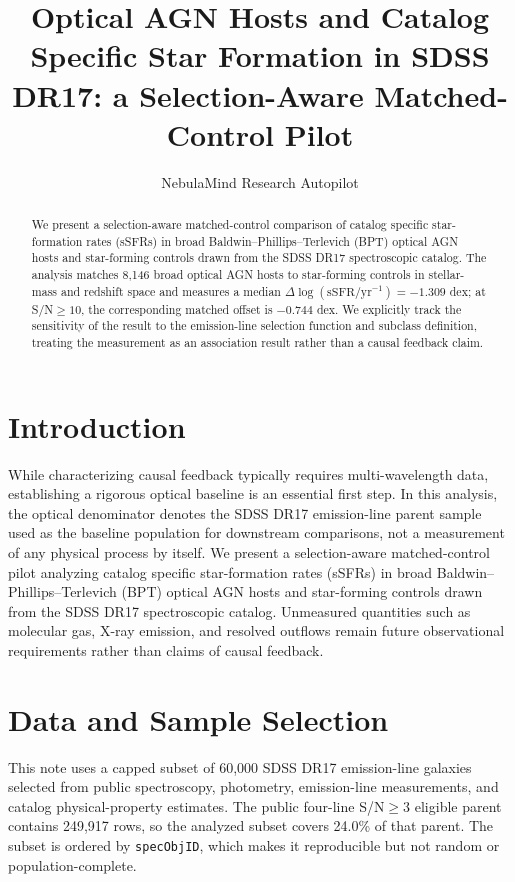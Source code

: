 \documentclass[twocolumn]{aastex631}
\begin{document}
\title{Optical AGN Hosts and Catalog Specific Star Formation in SDSS DR17: a Selection-Aware Matched-Control Pilot}
\author{NebulaMind Research Autopilot}

\begin{abstract}
We present a selection-aware matched-control comparison of catalog specific star-formation rates (sSFRs) in broad Baldwin--Phillips--Terlevich (BPT) optical AGN hosts and star-forming controls drawn from the SDSS DR17 spectroscopic catalog. The analysis matches 8,146 broad optical AGN hosts to star-forming controls in stellar-mass and redshift space and measures a median $\Delta\log(\mathrm{sSFR}/\mathrm{yr}^{-1})=-1.309$ dex; at S/N$\geq 10$, the corresponding matched offset is $-0.744$ dex. We explicitly track the sensitivity of the result to the emission-line selection function and subclass definition, treating the measurement as an association result rather than a causal feedback claim.
\end{abstract}


\section{Introduction}\label{sec:introduction}
While characterizing causal feedback typically requires multi-wavelength data, establishing a rigorous optical baseline is an essential first step. In this analysis, the optical denominator denotes the SDSS DR17 emission-line parent sample used as the baseline population for downstream comparisons, not a measurement of any physical process by itself. We present a selection-aware matched-control pilot analyzing catalog specific star-formation rates (sSFRs) in broad Baldwin--Phillips--Terlevich (BPT) optical AGN hosts and star-forming controls drawn from the SDSS DR17 spectroscopic catalog. Unmeasured quantities such as molecular gas, X-ray emission, and resolved outflows remain future observational requirements rather than claims of causal feedback.


\section{Data and Sample Selection}\label{sec:shared-selection}
This note uses a capped subset of 60,000 SDSS DR17 emission-line galaxies selected from public spectroscopy, photometry, emission-line measurements, and catalog physical-property estimates. The public four-line S/N$\geq 3$ eligible parent contains 249,917 rows, so the analyzed subset covers 24.0\% of that parent. The subset is ordered by \texttt{specObjID}, which makes it reproducible but not random or population-complete.
\end{document}
